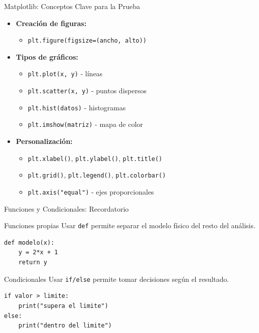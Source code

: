 \documentclass[10pt]{beamer}
\begin{document}
\begin{frame}{Matplotlib: Conceptos Clave para la Prueba}
  \begin{itemize}
    \item \textbf{Creación de figuras:}
      \begin{itemize}
        \item \texttt{plt.figure(figsize=(ancho, alto))}
      \end{itemize}
    \item \textbf{Tipos de gráficos:}
      \begin{itemize}
        \item \texttt{plt.plot(x, y)} - líneas
        \item \texttt{plt.scatter(x, y)} - puntos dispersos
        \item \texttt{plt.hist(datos)} - histogramas
        \item \texttt{plt.imshow(matriz)} - mapa de color
      \end{itemize}
    \item \textbf{Personalización:}
      \begin{itemize}
        \item \texttt{plt.xlabel()}, \texttt{plt.ylabel()}, \texttt{plt.title()}
        \item \texttt{plt.grid()}, \texttt{plt.legend()}, \texttt{plt.colorbar()}
        \item \texttt{plt.axis("equal")} - ejes proporcionales
      \end{itemize}
  \end{itemize}
\end{frame}

\begin{frame}[fragile]{Funciones y Condicionales: Recordatorio}
  \begin{block}{Funciones propias}
    Usar \texttt{def} permite separar el modelo físico del resto del análisis.
  \end{block}
\begin{Verbatim}[fontsize=\scriptsize]
def modelo(x):
    y = 2*x + 1
    return y
\end{Verbatim}

  \begin{block}{Condicionales}
    Usar \texttt{if/else} permite tomar decisiones según el resultado.
  \end{block}
\begin{Verbatim}[fontsize=\scriptsize]
if valor > limite:
    print("supera el limite")
else:
    print("dentro del limite")
\end{Verbatim}
\end{frame}
\end{document}
